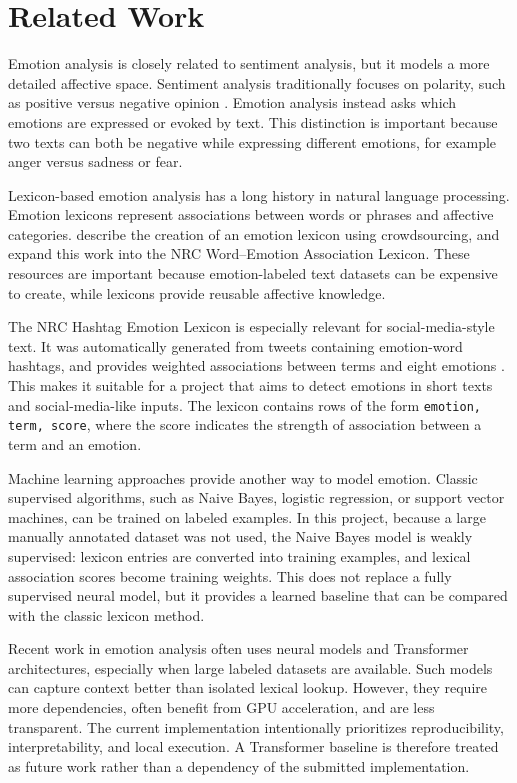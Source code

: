 \section{Related Work}

Emotion analysis is closely related to sentiment analysis, but it models a more detailed affective space. Sentiment analysis traditionally focuses on polarity, such as positive versus negative opinion \citep{pang2008opinion}. Emotion analysis instead asks which emotions are expressed or evoked by text. This distinction is important because two texts can both be negative while expressing different emotions, for example anger versus sadness or fear.

Lexicon-based emotion analysis has a long history in natural language processing. Emotion lexicons represent associations between words or phrases and affective categories. \citet{mohammad2010emotions} describe the creation of an emotion lexicon using crowdsourcing, and \citet{mohammad2013crowdsourcing} expand this work into the NRC Word--Emotion Association Lexicon. These resources are important because emotion-labeled text datasets can be expensive to create, while lexicons provide reusable affective knowledge.

The NRC Hashtag Emotion Lexicon is especially relevant for social-media-style text. It was automatically generated from tweets containing emotion-word hashtags, and provides weighted associations between terms and eight emotions \citep{mohammad2012emotional,mohammad2015hashtags}. This makes it suitable for a project that aims to detect emotions in short texts and social-media-like inputs. The lexicon contains rows of the form \texttt{emotion, term, score}, where the score indicates the strength of association between a term and an emotion.

Machine learning approaches provide another way to model emotion. Classic supervised algorithms, such as Naive Bayes, logistic regression, or support vector machines, can be trained on labeled examples. In this project, because a large manually annotated dataset was not used, the Naive Bayes model is weakly supervised: lexicon entries are converted into training examples, and lexical association scores become training weights. This does not replace a fully supervised neural model, but it provides a learned baseline that can be compared with the classic lexicon method.

Recent work in emotion analysis often uses neural models and Transformer architectures, especially when large labeled datasets are available. Such models can capture context better than isolated lexical lookup. However, they require more dependencies, often benefit from GPU acceleration, and are less transparent. The current implementation intentionally prioritizes reproducibility, interpretability, and local execution. A Transformer baseline is therefore treated as future work rather than a dependency of the submitted implementation.

